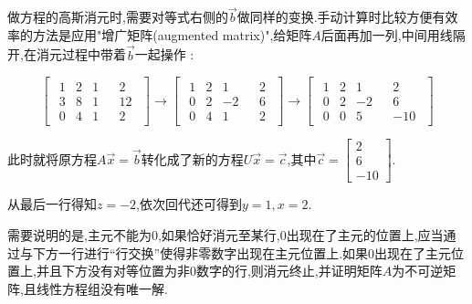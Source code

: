\documentclass[UTF8,12pt]{ctexbook}
\newcommand{\mediumBigCase}[1]{\left[#1\right]}
\newcommand{\augmentedMatrix}[2]{
  \mediumBigCase{
    \begin{array}{c|c}
      #1 & #2
    \end{array}
    }
    }
\begin{document}
{{{{{  做方程的高斯消元时,需要对等式右侧的$\vec{b}$做同样的变换.手动计算时比较方便有效率的方法是应用"增广矩阵(augmented matrix)",给矩阵$A$后面再加一列,中间用线隔开,在消元过程中带着$\vec{b}$一起操作 :

  $$
    \augmentedMatrix{
      \begin{matrix}
        1 & 2 & 1 \\
        3 & 8 & 1 \\
        0 & 4 & 1
      \end{matrix}
    }{
      \begin{matrix}
        2  \\
        12 \\
        2
      \end{matrix}
    }
    \to
    \augmentedMatrix{
      \begin{matrix}
        1 & 2 & 1  \\
        0 & 2 & -2 \\
        0 & 4 & 1
      \end{matrix}
    }{
      \begin{matrix}
        2 \\
        6 \\
        2
      \end{matrix}
    }
    \to
    \augmentedMatrix{
      \begin{matrix}
        1 & 2 & 1  \\
        0 & 2 & -2 \\
        0 & 0 & 5
      \end{matrix}
    }{
      \begin{matrix}
        2 \\
        6 \\
        -10
      \end{matrix}
    }
  $$

  此时就将原方程$A\vec{x} = \vec{b}$转化成了新的方程$U\vec{x} = \vec{c}$,其中$\vec{c} = \begin{bmatrix}
      2 \\
      6 \\
      -10
    \end{bmatrix}$.

  从最后一行得知$z = -2$,依次回代还可得到$y = 1,x = 2$.

  需要说明的是,主元不能为$0$,如果恰好消元至某行,$0$出现在了主元的位置上,应当通过与下方一行进行“行交换”使得非零数字出现在主元位置上.如果$0$出现在了主元位置上,并且下方没有对等位置为非$0$数字的行,则消元终止,并证明矩阵$A$为不可逆矩阵,且线性方程组没有唯一解.
}%

}}}}
\end{document}

